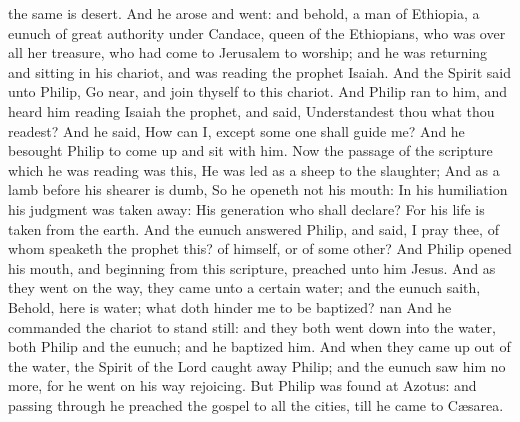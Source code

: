 the same is desert. And he arose and went: and behold, a man of Ethiopia, a eunuch of great authority under Candace, queen of the Ethiopians, who was over all her treasure, who had come to Jerusalem to worship; and he was returning and sitting in his chariot, and was reading the prophet Isaiah. And the Spirit said unto Philip, Go near, and join thyself to this chariot. And Philip ran to him, and heard him reading Isaiah the prophet, and said, Understandest thou what thou readest? And he said, How can I, except some one shall guide me? And he besought Philip to come up and sit with him. Now the passage of the scripture which he was reading was this, He was led as a sheep to the slaughter; And as a lamb before his shearer is dumb, So he openeth not his mouth:  In his humiliation his judgment was taken away: His generation who shall declare? For his life is taken from the earth.  And the eunuch answered Philip, and said, I pray thee, of whom speaketh the prophet this? of himself, or of some other? And Philip opened his mouth, and beginning from this scripture, preached unto him Jesus. And as they went on the way, they came unto a certain water; and the eunuch saith, Behold, here is water; what doth hinder me to be baptized? nan And he commanded the chariot to stand still: and they both went down into the water, both Philip and the eunuch; and he baptized him. And when they came up out of the water, the Spirit of the Lord caught away Philip; and the eunuch saw him no more, for he went on his way rejoicing. But Philip was found at Azotus: and passing through he preached the gospel to all the cities, till he came to Cæsarea. 

